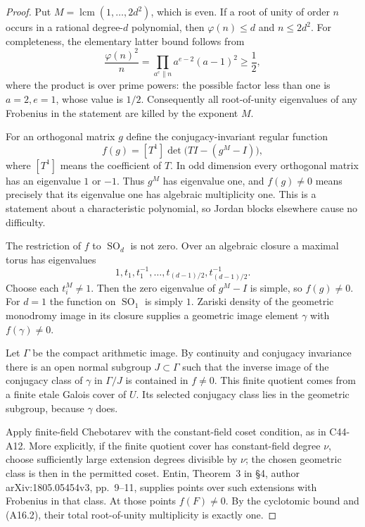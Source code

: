 \documentclass[11pt]{article}
\theoremstyle{remark}\newtheorem{remark}[theorem]{Remark}
\begin{document}
\begin{proof}
Put $M=\operatorname{lcm}(1,\ldots,2d^2)$, which is even.
If a root of unity of order $n$ occurs in a rational degree-$d$
polynomial, then $\varphi(n)\leq d$ and $n\leq2d^2$.
For completeness, the elementary latter bound follows from
\[
 \frac{\varphi(n)^2}{n}
       =\prod_{a^e\parallel n}a^{e-2}(a-1)^2\geq\frac12,
 \tag{A16.1}
\]
where the product is over prime powers: the possible factor
less than one is $a=2,e=1$, whose value is $1/2$.
Consequently all root-of-unity eigenvalues of any Frobenius
in the statement are killed by the exponent $M$.

For an orthogonal matrix $g$ define the conjugacy-invariant
regular function
\[
 f(g)=[T^1]\det\bigl(TI-(g^M-I)\bigr),
 \tag{A16.2}
\]
where $[T^1]$ means the coefficient of $T$. In odd dimension
every orthogonal matrix has an eigenvalue $1$ or $-1$.
Thus $g^M$ has eigenvalue one, and $f(g)\ne0$ means precisely
that its eigenvalue one has algebraic multiplicity one.
This is a statement about a characteristic polynomial, so
Jordan blocks elsewhere cause no difficulty.

The restriction of $f$ to $\operatorname{SO}_d$ is not zero.
Over an algebraic closure a maximal torus has eigenvalues
\[
             1,t_1,t_1^{-1},\ldots,t_{(d-1)/2},t_{(d-1)/2}^{-1}.
\]
Choose each $t_i^M\ne1$. Then the zero eigenvalue of
$g^M-I$ is simple, so $f(g)\ne0$. For $d=1$ the function
on $\operatorname{SO}_1$ is simply $1$.
Zariski density of the geometric monodromy image in its
closure supplies a geometric image element $\gamma$ with
$f(\gamma)\ne0$.

Let $\Gamma$ be the compact arithmetic image. By continuity
and conjugacy invariance there is an open normal subgroup
$J\subset\Gamma$ such that the inverse image of the
conjugacy class of $\gamma$ in $\Gamma/J$ is contained in
$f\ne0$. This finite quotient comes from a finite etale
Galois cover of $U$. Its selected conjugacy class lies in
the geometric subgroup, because $\gamma$ does.

Apply finite-field Chebotarev with the constant-field coset
condition, as in C44-A12. More explicitly, if the finite
quotient cover has constant-field degree $\nu$, choose
sufficiently large extension degrees divisible by $\nu$;
the chosen geometric class is then in the permitted coset.
Entin, Theorem~3 in \S4, author arXiv:1805.05454v3,
pp.~9--11, supplies points over such extensions with
Frobenius in that class. At those points $f(F)\ne0$.
By the cyclotomic bound and (A16.2), their total
root-of-unity multiplicity is exactly one.


\end{proof}
\end{document}
